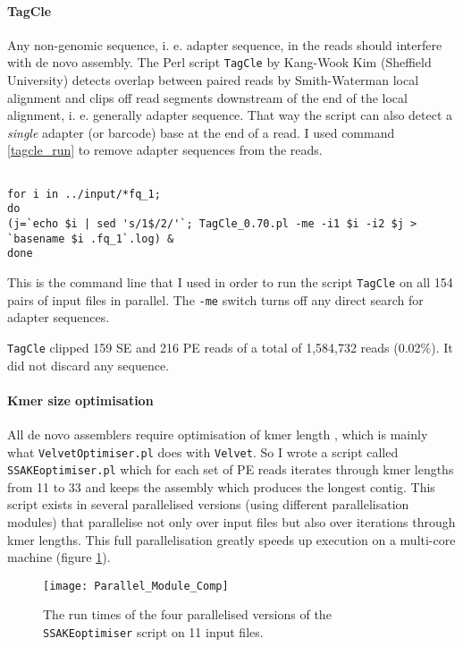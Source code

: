 \documentclass[a4paper,12pt,times,authoryear,twoside,print,index]{Classes/PhDThesisPSnPDF}\usepackage[]{graphicx}\usepackage[]{color}
\begin{document}
%
%
%

\paragraph{TagCle}
Any non-genomic sequence, i. e. adapter sequence, in the reads should interfere with de novo assembly. The Perl script \texttt{TagCle} by Kang-Wook Kim (Sheffield University) detects overlap between paired reads by Smith-Waterman local alignment and clips off read segments downstream of the end of the local alignment, i. e. generally adapter sequence. That way the script can also detect a \emph{single} adapter (or barcode) base at the end of a read. I used command \ref{tagcle_run} to remove adapter sequences from the reads.
%
\begin{cmd}
\captionsetup{type=cmd} %
\begin{Verbatim}[fontsize=\scriptsize, formatcom=\color{darkgray}]

for i in ../input/*fq_1; 
do 
(j=`echo $i | sed 's/1$/2/'`; TagCle_0.70.pl -me -i1 $i -i2 $j > `basename $i .fq_1`.log) & 
done
\end{Verbatim}
\caption{\small This is the command line that I used in order to run the script \texttt{TagCle} on all 154 pairs of input files in parallel. The \texttt{-me} switch turns off any direct search for adapter sequences.}
\label{tagcle_run}
\end{cmd}
%
\texttt{TagCle} clipped 159 SE and 216 PE reads of a total of 1,584,732 reads (0.02\%). It did not discard any sequence.

%
%
%

\paragraph{Kmer size optimisation}
All de novo assemblers require optimisation of \gls{kmer} length \citep{Davey2012}, which is mainly what \texttt{VelvetOptimiser.pl} does with \texttt{Velvet}. So I wrote a script called \texttt{SSAKEoptimiser.pl} which for each set of PE reads iterates through \gls{kmer} lengths from 11 to 33 and keeps the assembly which produces the longest contig. This script exists in several parallelised versions (using different parallelisation modules) that parallelise not only over input files but also over iterations through \gls{kmer} lengths. This full parallelisation greatly speeds up execution on a multi-core machine (figure \ref{runtimes}).
%
\begin{figure}
\centering
\texttt{[image: Parallel\_Module\_Comp]}
\caption{The run times of the four parallelised versions of the \texttt{SSAKEoptimiser} script on 11 input files.}
\label{runtimes}
\end{figure}
\end{document}
